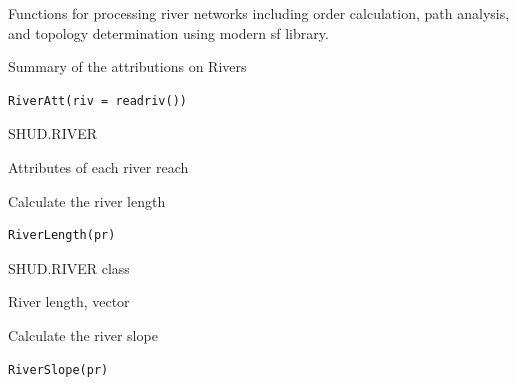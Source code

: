 \documentclass[a4paper]{book}
\begin{document}
%
\begin{Description}\relax
Functions for processing river networks including order calculation,
path analysis, and topology determination using modern sf library.
\end{Description}
%
\begin{Description}\relax
Summary of the attributions on Rivers
\end{Description}
%
\begin{Usage}
\begin{verbatim}
RiverAtt(riv = readriv())
\end{verbatim}
\end{Usage}
%
\begin{Arguments}
\begin{ldescription}
\item[\code{riv}] SHUD.RIVER
\end{ldescription}
\end{Arguments}
%
\begin{Value}
Attributes of each river reach
\end{Value}
%
\begin{Description}\relax
Calculate the river length
\end{Description}
%
\begin{Usage}
\begin{verbatim}
RiverLength(pr)
\end{verbatim}
\end{Usage}
%
\begin{Arguments}
\begin{ldescription}
\item[\code{pr}] SHUD.RIVER class
\end{ldescription}
\end{Arguments}
%
\begin{Value}
River length, vector
\end{Value}
%
\begin{Description}\relax
Calculate the river slope
\end{Description}
%
\begin{Usage}
\begin{verbatim}
RiverSlope(pr)
\end{verbatim}
\end{Usage}
\end{document}

